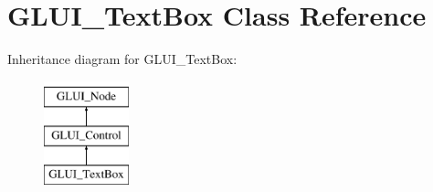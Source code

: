 \hypertarget{classGLUI__TextBox}{\section{G\-L\-U\-I\-\_\-\-Text\-Box Class Reference}
\label{classGLUI__TextBox}
}
Inheritance diagram for G\-L\-U\-I\-\_\-\-Text\-Box\-:\begin{figure}[H]
\begin{center}
\leavevmode
\includegraphics[height=3.000000cm]{classGLUI__TextBox}
\end{center}
\end{figure}
